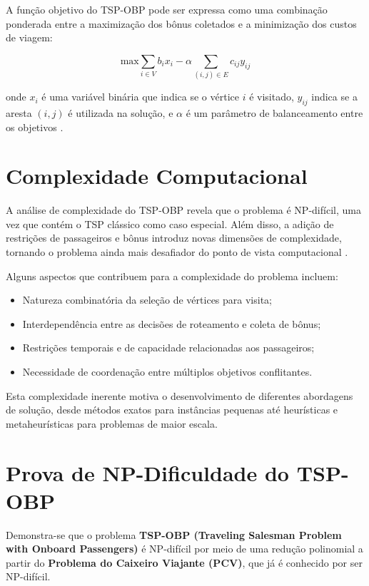 \documentclass[12pt, a4paper]{report}
\begin{document}
A função objetivo do TSP-OBP pode ser expressa como uma combinação ponderada entre a maximização dos bônus coletados e a minimização dos custos de viagem:

\begin{equation}
    \text{max} \sum_{i \in V} b_i x_i - \alpha \sum_{(i,j) \in E} c_{ij} y_{ij}
\end{equation}

onde $x_i$ é uma variável binária que indica se o vértice $i$ é visitado, $y_{ij}$ indica se a aresta $(i,j)$ é utilizada na solução, e $\alpha$ é um parâmetro de balanceamento entre os objetivos \cite{lopesfilho2019}.

\section{Complexidade Computacional}
A análise de complexidade do TSP-OBP revela que o problema é NP-difícil, uma vez que contém o TSP clássico como caso especial. Além disso, a adição de restrições de passageiros e bônus introduz novas dimensões de complexidade, tornando o problema ainda mais desafiador do ponto de vista computacional \cite{carvalho2022}.

Alguns aspectos que contribuem para a complexidade do problema incluem:

\begin{itemize}
    \item Natureza combinatória da seleção de vértices para visita;
    \item Interdependência entre as decisões de roteamento e coleta de bônus;
    \item Restrições temporais e de capacidade relacionadas aos passageiros;
    \item Necessidade de coordenação entre múltiplos objetivos conflitantes.
\end{itemize}

Esta complexidade inerente motiva o desenvolvimento de diferentes abordagens de solução, desde métodos exatos para instâncias pequenas até heurísticas e metaheurísticas para problemas de maior escala.

\section{Prova de NP-Dificuldade do TSP-OBP}

Demonstra-se que o problema \textbf{TSP-OBP (Traveling Salesman Problem with Onboard Passengers)} é NP-difícil por meio de uma redução polinomial a partir do \textbf{Problema do Caixeiro Viajante (PCV)}, que já é conhecido por ser NP-difícil.
\end{document}

